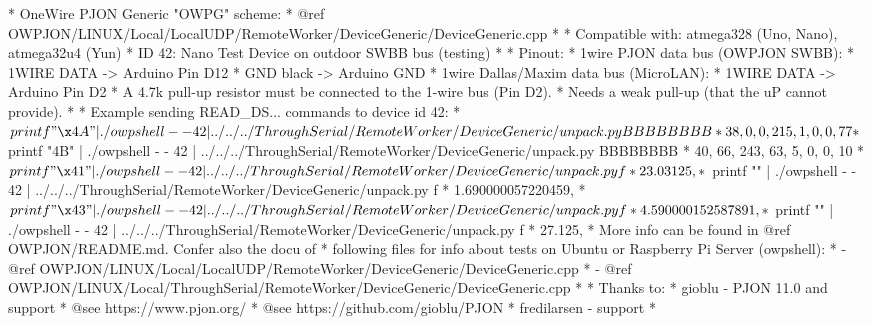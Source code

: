 \begin{DoxyVerb}* OneWire PJON Generic "OWPG" scheme:
*   @ref OWPJON/LINUX/Local/LocalUDP/RemoteWorker/DeviceGeneric/DeviceGeneric.cpp
*
* Compatible with: atmega328 (Uno, Nano), atmega32u4 (Yun)
*   ID 42: Nano Test Device on outdoor SWBB bus (testing)
*
* Pinout:
*   1wire PJON data bus (OWPJON SWBB):
*        1WIRE DATA    -> Arduino Pin D12
*        GND black     -> Arduino GND
*   1wire Dallas/Maxim data bus (MicroLAN):
*        1WIRE DATA    -> Arduino Pin D2
*   A 4.7k pull-up resistor must be connected to the 1-wire bus (Pin D2).
*   Needs a weak pull-up (that the uP cannot provide).
*
* Example sending READ_DS... commands to device id 42:
* $ printf "\x4A" | ./owpshell - - 42 | ../../../ThroughSerial/RemoteWorker/DeviceGeneric/unpack.py BBBBBBBB
* 38, 0, 0, 215, 1, 0, 0, 77
* $ printf "\x4B" | ./owpshell - - 42 | ../../../ThroughSerial/RemoteWorker/DeviceGeneric/unpack.py BBBBBBBB
* 40, 66, 243, 63, 5, 0, 0, 10
* $ printf "\x41" | ./owpshell - - 42 | ../../../ThroughSerial/RemoteWorker/DeviceGeneric/unpack.py f
* 23.03125,
* $ printf "" | ./owpshell - - 42 | ../../../ThroughSerial/RemoteWorker/DeviceGeneric/unpack.py f
* 1.690000057220459,
* $ printf "\x43" | ./owpshell - - 42 | ../../../ThroughSerial/RemoteWorker/DeviceGeneric/unpack.py f
* 4.590000152587891,
* $ printf "" | ./owpshell - - 42 | ../../../ThroughSerial/RemoteWorker/DeviceGeneric/unpack.py f
* 27.125,
* More info can be found in @ref OWPJON/README.md. Confer also the docu of
* following files for info about tests on Ubuntu or Raspberry Pi Server (owpshell):
*   - @ref OWPJON/LINUX/Local/LocalUDP/RemoteWorker/DeviceGeneric/DeviceGeneric.cpp
*   - @ref OWPJON/LINUX/Local/ThroughSerial/RemoteWorker/DeviceGeneric/DeviceGeneric.cpp
*
* Thanks to:
* gioblu - PJON 11.0 and support
*          @see https://www.pjon.org/
*          @see https://github.com/gioblu/PJON
* fredilarsen - support
* \end{DoxyVerb}
 

